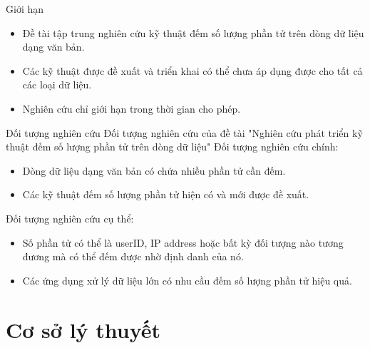 \documentclass[10pt]{beamer}
\begin{document}
\begin{frame}{Giới hạn}
  \begin{itemize}
    \item Đề tài tập trung nghiên cứu kỹ thuật đếm số lượng phần tử trên dòng dữ liệu dạng văn bản.
    \item Các kỹ thuật được đề xuất và triển khai có thể chưa áp dụng được cho tất cả các loại dữ liệu.
    \item Nghiên cứu chỉ giới hạn trong thời gian cho phép.
  \end{itemize}
\end{frame}

{
\begin{frame}{Đối tượng nghiên cứu}
  Đối tượng nghiên cứu của đề tài "Nghiên cứu phát triển kỹ thuật đếm số lượng phần tử trên dòng dữ liệu"
  Đối tượng nghiên cứu chính:
  \begin{itemize}
      \item Dòng dữ liệu dạng văn bản có chứa nhiều phần tử cần đếm.
      \item Các kỹ thuật đếm số lượng phần tử hiện có và mới được đề xuất.
  \end{itemize}
  Đối tượng nghiên cứu cụ thể:
  \begin{itemize}
      \item Số phần tử có thể là userID, IP address hoặc bất kỳ đối tượng nào tương đương mà có thể đếm được nhờ định danh của nó.
      \item Các ứng dụng xử lý dữ liệu lớn có nhu cầu đếm số lượng phần tử hiệu quả.
  \end{itemize}
\end{frame}
}

\section{Cơ sở lý thuyết}
\end{document}
